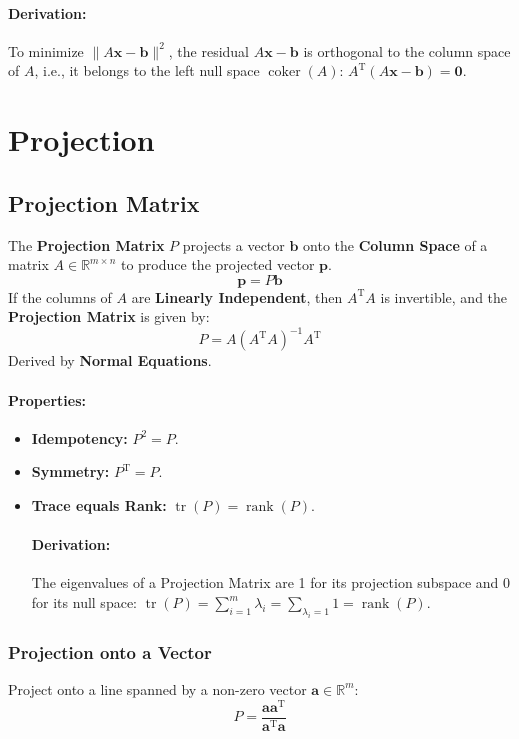 \documentclass{article}
\begin{document}
\paragraph{Derivation:} To minimize $\|A\mathbf{x} - \mathbf{b}\|^2$, the residual $A\mathbf{x} - \mathbf{b}$ is orthogonal to the column space of $A$, i.e., it belongs to the left null space $\operatorname{coker}(A)$: $A^{\mathrm{T}}(A\mathbf{x} - \mathbf{b}) = \mathbf{0}$.


\newpage
\section{Projection}

\subsection{Projection Matrix}

The \textbf{Projection Matrix} $P$ projects a vector $\mathbf{b}$ onto the \textbf{Column Space} of a matrix $A \in \mathbb{R}^{m \times n}$ to produce the projected vector $\mathbf{p}$.
\[
    \mathbf{p} = P\mathbf{b}
\]
If the columns of $A$ are \textbf{Linearly Independent}, then $A^{\mathrm{T}}A$ is invertible, and the \textbf{Projection Matrix} is given by:
\[
    P = A(A^{\mathrm{T}}A)^{-1}A^{\mathrm{T}}
\]
Derived by \textbf{Normal Equations}.
\paragraph{Properties:}
\begin{itemize}
    \item \textbf{Idempotency:} $P^2 = P$.
    \item \textbf{Symmetry:} $P^{\mathrm{T}} = P$.
    \item \textbf{Trace equals Rank:} $\operatorname{tr}(P) = \operatorname{rank}(P)$.
    \paragraph{Derivation:} The eigenvalues of a Projection Matrix are 1 for its projection subspace and 0 for its null space: $\operatorname{tr}(P) = \sum_{i=1}^m \lambda_i = \sum_{\lambda_i=1} 1 = \operatorname{rank}(P)$.
\end{itemize}

\subsubsection{Projection onto a Vector}
Project onto a line spanned by a non-zero vector $\mathbf{a} \in \mathbb{R}^m$:
\[
    P = \frac{\mathbf{a}\mathbf{a}^{\mathrm{T}}}{\mathbf{a}^{\mathrm{T}}\mathbf{a}}
\]
\end{document}
